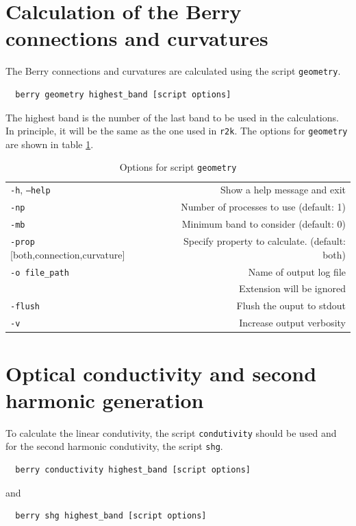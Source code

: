 \documentclass[a4paper,12pt]{report}
\begin{document}
\section{Calculation of the Berry connections and curvatures}

The Berry connections and curvatures are calculated using the script \texttt{geometry}.
\begin{verbatim}
  berry geometry highest_band [script options]
 \end{verbatim}


The highest band is the number of the last band to be used in the calculations.
In principle, it will be the same as the one used in \texttt{r2k}.
The options for \texttt{geometry} are shown in table \ref{tab:options_geometry}.

\begin{table}[ht]
 \centering
 \caption{Options for script \texttt{geometry}}\label{tab:options_geometry}
\begin{tabular}[]{lr}
  \hline
  \texttt{-h}, \texttt{--help}  &\hspace*{2cm} Show a help message and exit \\
  \texttt{-np}                  & Number of processes to use (default: 1) \\
  \texttt{-mb}                  & Minimum band to consider (default: 0) \\
  \texttt{-prop} [both,connection,curvature] &  Specify property to calculate. (default: both)\\
  \texttt{-o file\_path}        & Name of output log file\\
                                & Extension will be ignored\\
  \texttt{-flush}               & Flush the ouput to stdout \\
  \texttt{-v}                   & Increase output verbosity \\
  \hline
\end{tabular}
\end{table}



\section{Optical conductivity and second harmonic generation}

To calculate the linear condutivity, the script \texttt{condutivity} should be used
and for the second harmonic condutivity, the script \texttt{shg}.
\begin{verbatim}
  berry conductivity highest_band [script options]
 \end{verbatim}
 and
 \begin{verbatim}
  berry shg highest_band [script options]
 \end{verbatim}
\end{document}

